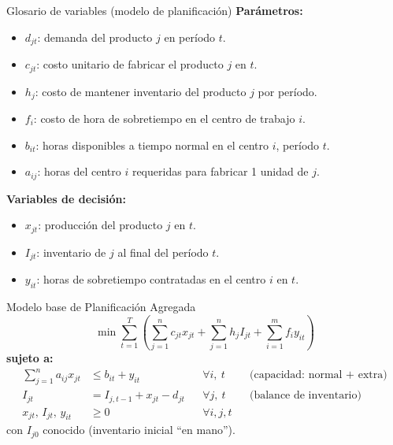 \begin{formulas}{Glosario de variables (modelo de planificación)}
\textbf{Parámetros:}
\begin{itemize}[leftmargin=1.4em, itemsep=1pt]
  \item $d_{jt}$: demanda del producto $j$ en período $t$.
  \item $c_{jt}$: costo unitario de fabricar el producto $j$ en $t$.
  \item $h_j$: costo de mantener inventario del producto $j$ por período.
  \item $f_i$: costo de hora de sobretiempo en el centro de trabajo $i$.
  \item $b_{it}$: horas disponibles a tiempo normal en el centro $i$, período $t$.
  \item $a_{ij}$: horas del centro $i$ requeridas para fabricar 1 unidad de $j$.
\end{itemize}
\textbf{Variables de decisión:}
\begin{itemize}[leftmargin=1.4em, itemsep=1pt]
  \item $x_{jt}$: producción del producto $j$ en $t$.
  \item $I_{jt}$: inventario de $j$ al final del período $t$.
  \item $y_{it}$: horas de sobretiempo contratadas en el centro $i$ en $t$.
\end{itemize}
\end{formulas}

\begin{formulas}{Modelo base de Planificación Agregada}
\[
  \min \sum_{t=1}^{T}\left( \sum_{j=1}^{n} c_{jt}x_{jt} + \sum_{j=1}^{n} h_j I_{jt} + \sum_{i=1}^{m} f_i y_{it} \right)
\]
\textbf{sujeto a:}
\begin{align*}
  \sum_{j=1}^{n} a_{ij}x_{jt} &\le b_{it} + y_{it} && \forall i,\ t && \text{(capacidad: normal + extra)}\\
  I_{jt} &= I_{j,t-1} + x_{jt} - d_{jt} && \forall j,\ t && \text{(balance de inventario)}\\
  x_{jt},\, I_{jt},\, y_{it} &\ge 0 && \forall i,j,t
\end{align*}
con $I_{j0}$ conocido (inventario inicial ``en mano'').
\end{formulas}


